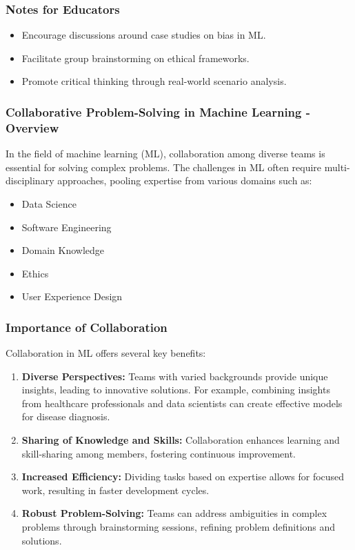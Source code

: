 \documentclass[aspectratio=169]{beamer}
\begin{document}
\begin{frame}[fragile]
    \frametitle{Notes for Educators}
    \begin{itemize}
        \item Encourage discussions around case studies on bias in ML.
        \item Facilitate group brainstorming on ethical frameworks.
        \item Promote critical thinking through real-world scenario analysis.
    \end{itemize}
\end{frame}

\begin{frame}[fragile]
    \frametitle{Collaborative Problem-Solving in Machine Learning - Overview}
    In the field of machine learning (ML), collaboration among diverse teams is essential for solving complex problems. 
    The challenges in ML often require multi-disciplinary approaches, pooling expertise from various domains such as:
    \begin{itemize}
        \item Data Science
        \item Software Engineering
        \item Domain Knowledge
        \item Ethics
        \item User Experience Design
    \end{itemize}
\end{frame}

\begin{frame}[fragile]
    \frametitle{Importance of Collaboration}
    Collaboration in ML offers several key benefits:
    
    \begin{enumerate}
        \item \textbf{Diverse Perspectives:} 
        Teams with varied backgrounds provide unique insights, leading to innovative solutions. For example, combining insights from healthcare professionals and data scientists can create effective models for disease diagnosis.

        \item \textbf{Sharing of Knowledge and Skills:} 
        Collaboration enhances learning and skill-sharing among members, fostering continuous improvement.

        \item \textbf{Increased Efficiency:} 
        Dividing tasks based on expertise allows for focused work, resulting in faster development cycles.

        \item \textbf{Robust Problem-Solving:} 
        Teams can address ambiguities in complex problems through brainstorming sessions, refining problem definitions and solutions.
    \end{enumerate}
\end{frame}
\end{document}
